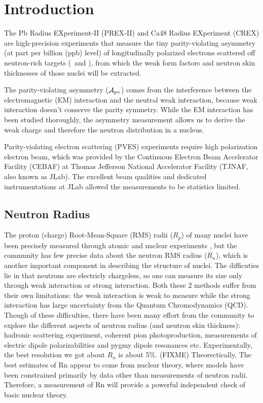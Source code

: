 \chapter{Introduction}

The Pb Radius EXperiment-II (PREX-II) and Ca48 Radius EXperiment (CREX) are 
high-precision experiments that measure the tiny parity-violating asymmetry 
(at part per billion (ppb) level) of longitudinally polarized electrons scattered 
off neutron-rich targets (\Pb \ and \Ca), from which the weak form factors and 
neutron skin thicknesses of those nuclei will be extracted.

The parity-violating asymmetry ($\mathcal{A}_{pv}$) comes from the interference between the 
electromagnetic (EM) interaction and the neutral weak interaction, because weak 
interaction doesn't conserve the parity symmetry. While the EM 
interaction has been studied thoroughly, the asymmetry measurement allows 
us to derive the weak charge and therefore the neutron distribution in a nucleus.

Parity-violating electron scattering (PVES) experiments require high polarization
electron beam, which was provided by the Continuous Electron Beam Accelerator
Facility (CEBAF) at Thomas Jefferson National Accelerator Facility (TJNAF, 
also known as JLab). The excellent beam qualities and dedicated instrumentations
at JLab allowed the measurements to be statistics limited.




\section{Neutron Radius}
The proton (charge) Root-Mean-Square (RMS) radii ($R_p$) of many nuclei have been
precisely measured through atomic and nuclear experiments \cite{???}, but 
the community has few precise data about the neutron RMS radius ($R_n$), which is another 
important component in describing the structure of nuclei. The difficuties lie in that
neutrons are electricly chargeless, so one can measure its size only through weak
interaction or strong interaction. Both these 2 methods suffer from their own
limitations: the weak interaction is weak to measure while the strong interaction
has large uncertainty from the Quantum Chromodynamics (QCD). Though of these
difficulties, there have been many effort from the community to explore the
different aspects of neutron radius (and neutron skin thickness): 
hadronic scattering experiment, coherent pion photoproduction,
measurements of electric dipole polarizabilities and pygmy dipole resonances etc.
Experimentally, the best resolution we got about $R_n$ is about 5\%. (FIXME)
Theorectically, The best estimates of Rn appear to come from nuclear theory, 
where models have been constrained primarily by data other than measurements 
of neutron radii. Therefore, a measurement of Rn will provide a powerful 
independent check of basic nuclear theory.

